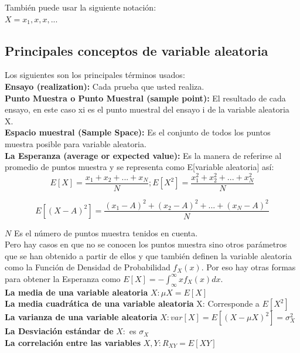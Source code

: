 También puede usar la siguiente notación: \\
$X= {x_{1}, x, x,...}$ \\

\subsection{Principales conceptos de variable aleatoria}

Los siguientes son los principales términos usados: \\

\textbf{Ensayo (realization):} Cada prueba que usted realiza. \\

\textbf{ Punto Muestra o Punto Muestral (sample point):} El resultado de cada ensayo, en este caso xi es el punto muestral del ensayo i de la variable aleatoria X. \\

\textbf{ Espacio muestral (Sample Space):} Es el conjunto de todos los puntos muestra posible para variable aleatoria. \\

\textbf{ La Esperanza (average or expected value):} Es la manera de referirse al promedio de puntos muestra y se representa como E[variable aleatoria] así: \\


\begin{equation} \label{capuno_variable}	
E[X]= \dfrac{x_{1} + x_{2} + ... + x_{N} }{N} ; E[X^{2}]= \dfrac{x_{1}^{2} + x_{2}^{2} + ... + x_{N}^{2} }{N}
\end{equation}

\begin{equation} \label{capuno_variabledos}	
E[({X-A})^{2}]=  \dfrac{{(x_{1}-A)}^{2} + {(x_{2}-A)}^{2} + ... + {(x_{N}-A)}^{2} }{N}
\end{equation}

$N$ Es el número de puntos muestra tenidos en cuenta. \\
Pero hay casos en que no se conocen los puntos muestra sino otros parámetros que se han obtenido a partir de ellos y que también definen la variable aleatoria como la Función de Densidad de Probabilidad $f_{X}(x)$. Por eso hay otras formas para obtener la Esperanza como $E[X]=-\int_{\infty}^{\infty}xf_{X}(x)dx$. \\

\textbf{ La media de una variable aleatoria} $X: \mu X=E[X]$ \\
\textbf{ La media cuadrática de una variable aleatoria} X: Corresponde a $E[X^{2}]$ \\
\textbf{ La varianza de una variable aleatoria} $X: var[X]=E[{(X- \mu X)}^{2}]= {\sigma}_{X}^{2}$ \\
\textbf{ La Desviación estándar de} $ X :$ es ${\sigma}_{X}$\\
\textbf{ La correlación entre las variables} $ X,Y: R_{XY}=E[XY]$\\

